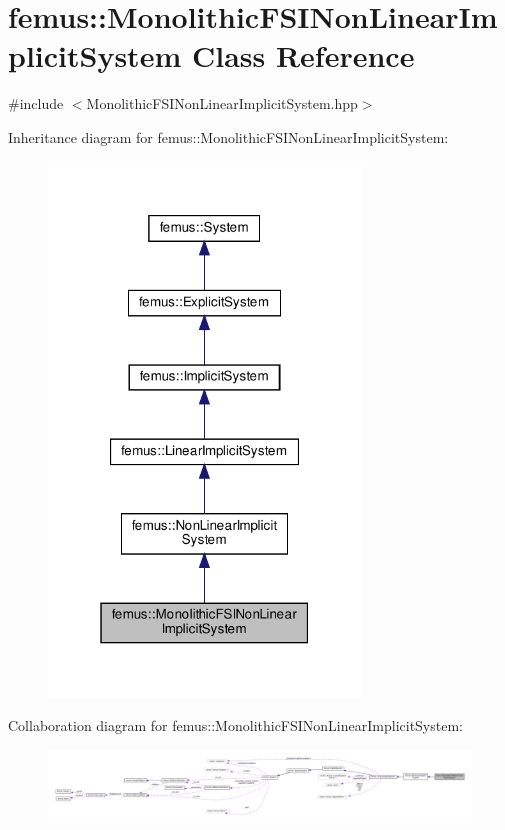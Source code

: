 \hypertarget{classfemus_1_1_monolithic_f_s_i_non_linear_implicit_system}{}\section{femus\+:\+:Monolithic\+F\+S\+I\+Non\+Linear\+Implicit\+System Class Reference}
\label{classfemus_1_1_monolithic_f_s_i_non_linear_implicit_system}


{\ttfamily \#include $<$Monolithic\+F\+S\+I\+Non\+Linear\+Implicit\+System.\+hpp$>$}



Inheritance diagram for femus\+:\+:Monolithic\+F\+S\+I\+Non\+Linear\+Implicit\+System\+:
\nopagebreak
\begin{figure}[H]
\begin{center}
\leavevmode
\includegraphics[width=235pt]{classfemus_1_1_monolithic_f_s_i_non_linear_implicit_system__inherit__graph}
\end{center}
\end{figure}


Collaboration diagram for femus\+:\+:Monolithic\+F\+S\+I\+Non\+Linear\+Implicit\+System\+:
\nopagebreak
\begin{figure}[H]
\begin{center}
\leavevmode
\includegraphics[width=350pt]{classfemus_1_1_monolithic_f_s_i_non_linear_implicit_system__coll__graph}
\end{center}
\end{figure}

